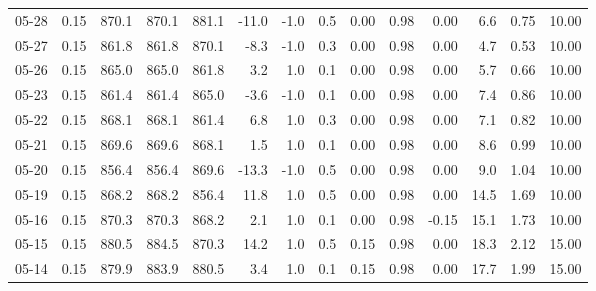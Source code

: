 \begin{threeparttable}
{\begin{tabular}{lrrrrrrrrrrrrr}
  05-28 &     0.15 & 870.1 & 870.1 & 881.1 &      -11.0 &                     -1.0 &                 0.5 &       0.00 &      0.98 &           0.00 &              6.6 &            0.75 &                  10.00 \\
  05-27 &     0.15 & 861.8 & 861.8 & 870.1 &       -8.3 &                     -1.0 &                 0.3 &       0.00 &      0.98 &           0.00 &              4.7 &            0.53 &                  10.00 \\
  05-26 &     0.15 & 865.0 & 865.0 & 861.8 &        3.2 &                      1.0 &                 0.1 &       0.00 &      0.98 &           0.00 &              5.7 &            0.66 &                  10.00 \\
  05-23 &     0.15 & 861.4 & 861.4 & 865.0 &       -3.6 &                     -1.0 &                 0.1 &       0.00 &      0.98 &           0.00 &              7.4 &            0.86 &                  10.00 \\
  05-22 &     0.15 & 868.1 & 868.1 & 861.4 &        6.8 &                      1.0 &                 0.3 &       0.00 &      0.98 &           0.00 &              7.1 &            0.82 &                  10.00 \\
  05-21 &     0.15 & 869.6 & 869.6 & 868.1 &        1.5 &                      1.0 &                 0.1 &       0.00 &      0.98 &           0.00 &              8.6 &            0.99 &                  10.00 \\
  05-20 &     0.15 & 856.4 & 856.4 & 869.6 &      -13.3 &                     -1.0 &                 0.5 &       0.00 &      0.98 &           0.00 &              9.0 &            1.04 &                  10.00 \\
  05-19 &     0.15 & 868.2 & 868.2 & 856.4 &       11.8 &                      1.0 &                 0.5 &       0.00 &      0.98 &           0.00 &             14.5 &            1.69 &                  10.00 \\
  05-16 &     0.15 & 870.3 & 870.3 & 868.2 &        2.1 &                      1.0 &                 0.1 &       0.00 &      0.98 &          -0.15 &             15.1 &            1.73 &                  10.00 \\
  05-15 &     0.15 & 880.5 & 884.5 & 870.3 &       14.2 &                      1.0 &                 0.5 &       0.15 &      0.98 &           0.00 &             18.3 &            2.12 &                  15.00 \\
  05-14 &     0.15 & 879.9 & 883.9 & 880.5 &        3.4 &                      1.0 &                 0.1 &       0.15 &      0.98 &           0.00 &             17.7 &            1.99 &                  15.00 \\

\end{tabular}}
\end{threeparttable}
